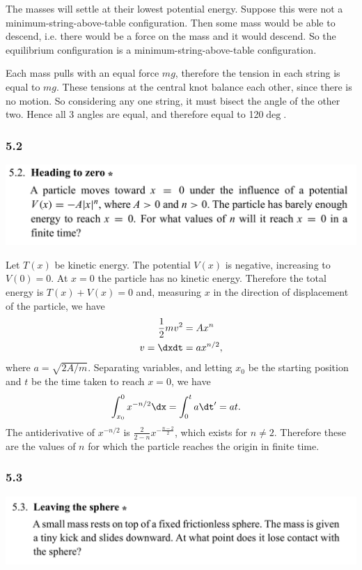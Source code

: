 The masses will settle at their lowest potential energy. Suppose this were not a
minimum-string-above-table configuration. Then some mass would be able to descend, i.e. there would
be a force on the mass and it would descend. So the equilibrium configuration is a
minimum-string-above-table configuration.

Each mass pulls with an equal force $mg$, therefore the tension in each string is equal to
$mg$. These tensions at the central knot balance each other, since there is no motion. So
considering any one string, it must bisect the angle of the other two. Hence all 3 angles are equal,
and therefore equal to 120$\deg$.

\subsubsection*{5.2}
\begin{mdframed}
  \includegraphics[width=400pt]{img/physics--classical-mechanics--morin--5-2.png}
\end{mdframed}

Let $T(x)$ be kinetic energy. The potential $V(x)$ is negative, increasing to $V(0) = 0$. At $x = 0$
the particle has no kinetic energy. Therefore the total energy is $T(x) + V(x) = 0$ and, measuring
$x$ in the direction of displacement of the particle, we have
\begin{align*}
  \frac{1}{2}mv^2 &= Ax^n \\
  v = \dxdt       &= a x^{n/2},
\end{align*}
where $a = \sqrt{2A/m}$. Separating variables, and letting $x_0$ be the starting position and $t$ be
the time taken to reach $x=0$, we have
\begin{align*}
  \int_{x_0}^0 x^{-n/2} \dx &= \int_0^t a\dt' = at.
\end{align*}
The antiderivative of $x^{-n/2}$ is $\frac{2}{2 - n}x^{-\frac{n - 2}{2}}$, which exists for
$n \neq 2$. Therefore these are the values of $n$ for which the particle reaches the origin in
finite time.

\subsubsection*{5.3}
\begin{mdframed}
  \includegraphics[width=400pt]{img/physics--classical-mechanics--morin--5-3.png}
\end{mdframed}

